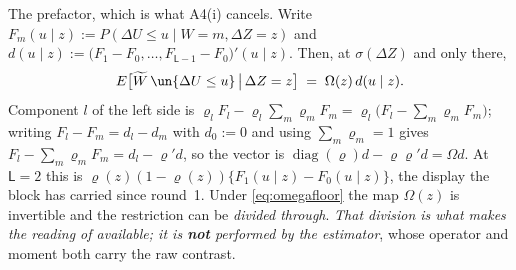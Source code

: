 The prefactor, which is what A4(i) cancels. Write $F_m(u\mid z):=P(\Delta U\le u\mid W=m,\Delta Z=z)$
and $d(u\mid z):=\big(F_1-F_0,\dots,F_{\mathsf L-1}-F_0\big)'(u\mid z)$. Then, at $\sigma(\Delta Z)$ and
only there,
\begin{equation}\label{eq:omegaprefac}
E\big[\widetilde W\,\un\{\Delta U\le u\}\,\big|\,\Delta Z=z\big]\;=\;\Omega(z)\,d(u\mid z) .
\end{equation}
Component $l$ of the left side is
$\varrho_lF_l-\varrho_l\sum_{m}\varrho_mF_m=\varrho_l\big(F_l-\sum_m\varrho_mF_m\big)$; writing
$F_l-F_m=d_l-d_m$ with $d_0:=0$ and using $\sum_m\varrho_m=1$ gives
$F_l-\sum_m\varrho_mF_m=d_l-\varrho'd$, so the vector is
$\operatorname{diag}(\varrho)d-\varrho\varrho'd=\Omega d$. At $\mathsf L=2$ this is
$\varrho(z)(1-\varrho(z))\{F_1(u\mid z)-F_0(u\mid z)\}$, the display the block has carried since
round~1. Under \eqref{eq:omegafloor} the map $\Omega(z)$ is invertible and the restriction can be
\emph{divided through}. \emph{That division is what makes the reading of 
available; it is \textbf{not} performed by the estimator}, whose operator and moment both carry the raw
contrast.

